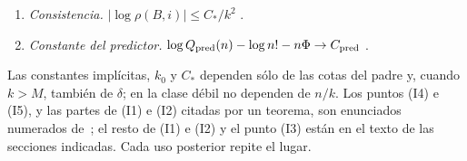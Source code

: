 \begin{enumerate}[({I}1)]
las restricciones de filas y columnas, «$B(p\odot\delta)=BRg=0$» y, «en toda fila original,
$\sum_{c\in{\rm fila}}p_c\delta_c=0$»; además, «la restricción eliminada en cada componente se
reconstruye por la igualdad de las sumas de filas y columnas». Con nuestra notación, si
$B_{\rm RC}$ es esa matriz, $B_{\rm RC}(p\odot d)=0$: $\sum_{e'\in R_i}p_{e'}d_{e'}=0$ en cada fila
vacía y $\sum_{e'\in C_j}p_{e'}d_{e'}=0$ en cada columna vacía.
\item \emph{Consistencia.} $|\log\rho(B,i)|\le C_*/k^2$ \cite[Corolario~7.2 y Teorema~8.1]{pred}.
\item \emph{Constante del predictor.} $\log Q_{\rm pred}(n)-\log n!-n\Phi\to C_{\rm pred}$
\cite[Teoremas~1.1 y~5.7]{pred}.
\end{enumerate}
Las constantes implícitas, $k_0$ y $C_*$ dependen sólo de las cotas del padre y, cuando $k>M$,
también de $\delta$; en la clase débil no dependen de $n/k$. Los puntos (I4) e (I5), y las partes
de (I1) e (I2) citadas por un teorema, son enunciados numerados de~\cite{pred}; el resto de (I1)
e (I2) y el punto (I3) están en el texto de las secciones indicadas. Cada uso posterior repite el
lugar.
